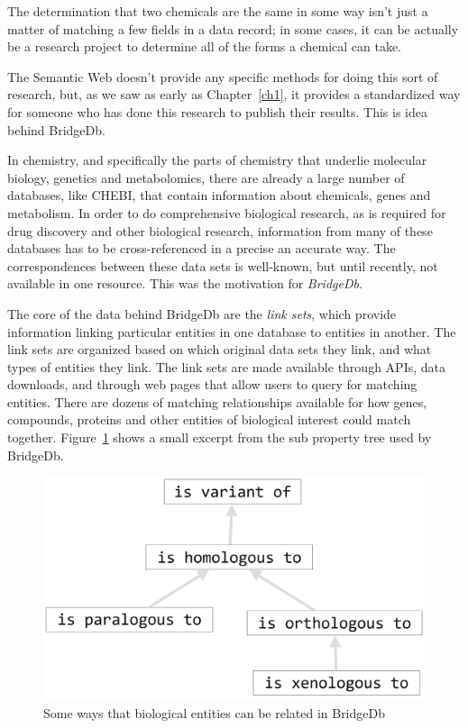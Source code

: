 The determination that two chemicals are the same in some way isn't just a matter of 
matching a few fields in a data record; in some cases, it can be actually be a research
project to determine all of the forms a chemical can take.  

The Semantic Web doesn't provide any specific methods for doing this sort of research, but,
as we saw as early as Chapter~\ref{ch1}, it provides a standardized way for someone 
who has done this research to publish their results.  This is idea behind BridgeDb.

In chemistry, and specifically the parts of chemistry that underlie molecular biology, genetics
and metabolomics, there are already a large number of databases, like CHEBI, that contain information 
about chemicals, genes and metabolism.  
In order to do comprehensive biological research, as is required for drug discovery and 
other biological research, information from many of these databases has to be cross-referenced
in a precise an accurate way.  The correspondences between these data sets is well-known, 
but until recently, not available in one resource.  This was the motivation for \emph{BridgeDb}. 

The core of the data behind BridgeDb are the \emph{link sets}, which provide information linking
particular entities in one database to entities in another.  The link sets are organized based on 
which original data sets they link, and what types of entities they link.  The link sets are made available 
through APIs, data downloads, and through web pages that allow users to query for matching 
entities.  There are dozens of matching relationships available for how genes, compounds, proteins and 
other entities of biological interest could match together.  Figure~\ref{Fig:ch10.3} shows a small excerpt
from the sub property tree used by BridgeDb. 

\begin{figure}
    \centering
    \includegraphics[width=5in]{SWWOv3/media/ch10/figure10-6.png}
    \caption{Some ways that biological entities can be related in BridgeDb}
    \label{Fig:ch10.3}
\end{figure}

